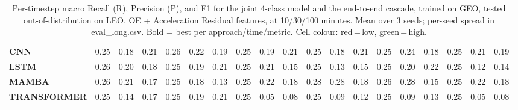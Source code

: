 \begin{table}[t]
{\begin{tabular}{l ccc ccc ccc ccc ccc ccc}
\textbf{CNN} & \cellcolor[HTML]{FF6B6B}0.25 & \cellcolor[HTML]{FF6B6B}0.18 & \cellcolor[HTML]{FF6B6B}0.21 & \cellcolor[HTML]{FF6E6A}0.26 & \cellcolor[HTML]{FF6B6B}0.22 & \cellcolor[HTML]{FF6B6B}0.19 & \cellcolor[HTML]{FF6B6B}0.25 & \cellcolor[HTML]{FF6B6B}0.19 & \cellcolor[HTML]{FF6B6B}0.21 & \cellcolor[HTML]{FF6B6B}0.25 & \cellcolor[HTML]{FF6B6B}0.18 & \cellcolor[HTML]{FF6B6B}0.21 & \cellcolor[HTML]{FF6C6A}0.25 & \cellcolor[HTML]{FF6B6B}0.24 & \cellcolor[HTML]{FF6B6B}0.18 & \cellcolor[HTML]{FF6D6A}0.25 & \cellcolor[HTML]{FF6B6B}0.21 & \cellcolor[HTML]{FF6B6B}0.19 \\
\textbf{LSTM} & \cellcolor[HTML]{FF7069}0.26 & \cellcolor[HTML]{FF6B6B}0.20 & \cellcolor[HTML]{FF6B6B}0.18 & \cellcolor[HTML]{FF6B6B}0.25 & \cellcolor[HTML]{FF6B6B}0.19 & \cellcolor[HTML]{FF6B6B}0.21 & \cellcolor[HTML]{FF6B6B}0.25 & \cellcolor[HTML]{FF6B6B}0.21 & \cellcolor[HTML]{FF6B6B}0.15 & \cellcolor[HTML]{FF6B6B}0.25 & \cellcolor[HTML]{FF6B6B}0.13 & \cellcolor[HTML]{FF6B6B}0.15 & \cellcolor[HTML]{FF6B6B}0.25 & \cellcolor[HTML]{FF6B6B}0.20 & \cellcolor[HTML]{FF6B6B}0.22 & \cellcolor[HTML]{FF6B6B}0.25 & \cellcolor[HTML]{FF6B6B}0.12 & \cellcolor[HTML]{FF6B6B}0.14 \\
\textbf{MAMBA} & \cellcolor[HTML]{FF7069}0.26 & \cellcolor[HTML]{FF6B6B}0.21 & \cellcolor[HTML]{FF6B6B}0.17 & \cellcolor[HTML]{FF6D6A}0.25 & \cellcolor[HTML]{FF6B6B}0.18 & \cellcolor[HTML]{FF6B6B}0.13 & \cellcolor[HTML]{FF6C6A}0.25 & \cellcolor[HTML]{FF6B6B}0.22 & \cellcolor[HTML]{FF6B6B}0.18 & \cellcolor[HTML]{FF7666}0.28 & \cellcolor[HTML]{FF7965}0.28 & \cellcolor[HTML]{FF6B6B}0.18 & \cellcolor[HTML]{FF7069}0.26 & \cellcolor[HTML]{FF7666}0.28 & \cellcolor[HTML]{FF6B6B}0.15 & \cellcolor[HTML]{FF6C6B}0.25 & \cellcolor[HTML]{FF6B6B}0.22 & \cellcolor[HTML]{FF6B6B}0.18 \\
\textbf{TRANSFORMER} & \cellcolor[HTML]{FF6B6B}0.25 & \cellcolor[HTML]{FF6B6B}0.14 & \cellcolor[HTML]{FF6B6B}0.17 & \cellcolor[HTML]{FF6B6B}0.25 & \cellcolor[HTML]{FF6B6B}0.19 & \cellcolor[HTML]{FF6B6B}0.21 & \cellcolor[HTML]{FF6B6B}0.25 & \cellcolor[HTML]{FF6B6B}0.05 & \cellcolor[HTML]{FF6B6B}0.08 & \cellcolor[HTML]{FF6B6B}0.25 & \cellcolor[HTML]{FF6B6B}0.09 & \cellcolor[HTML]{FF6B6B}0.12 & \cellcolor[HTML]{FF6B6B}0.25 & \cellcolor[HTML]{FF6B6B}0.09 & \cellcolor[HTML]{FF6B6B}0.13 & \cellcolor[HTML]{FF6B6B}0.25 & \cellcolor[HTML]{FF6B6B}0.05 & \cellcolor[HTML]{FF6B6B}0.08 \\
\bottomrule
\end{tabular}%
}
\caption{Per-timestep macro Recall (R), Precision (P), and F1 for the joint 4-class model and the end-to-end cascade, trained on GEO, tested out-of-distribution on LEO, OE + Acceleration Residual features, at 10/30/100 minutes. Mean over 3 seeds; per-seed spread in eval\_long.csv. Bold = best per approach/time/metric. Cell colour: red\,=\,low, green\,=\,high.}
\label{tab:seq_geo_to_leo_ladder_jc}
\end{table}
